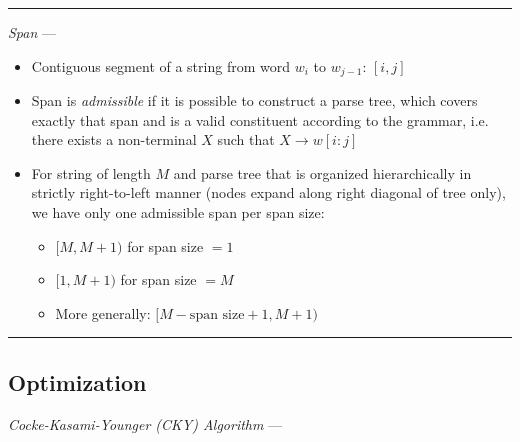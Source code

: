 {\color{lightgray}\hrule height 0.001mm}

\emph{Span} ---
\begin{itemize}
    \item Contiguous segment of a string from word $w_i$ to $w_{j-1}$: $[i, j]$
    \item Span is \emph{admissible} if it is possible to construct a parse tree, which covers exactly that span and is a valid constituent according to the grammar, i.e. there exists a non-terminal $X$ such that $X \to w[i:j]$
    \item For string of length $M$ and parse tree that is organized hierarchically in strictly right-to-left manner (nodes expand along right diagonal of tree only), we have only one admissible span per span size:
    \begin{multicols}{2}
    \begin{itemize}
        \item $
        [M, M+1)
        $ for span size $= 1$
        \item $
        [1, M+1)
        $ for span size $= M$
        \item More generally:
        $
        [M - \textrm{span size} + 1, M + 1)
        $
    \end{itemize}
    \end{multicols}
\end{itemize}

{\color{black}\hrule height 0.001mm}

\subsection*{Optimization}
\emph{Cocke-Kasami-Younger (CKY) Algorithm} ---

